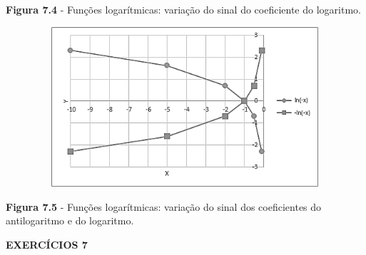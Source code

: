 \documentclass[12pt]{article}
\begin{document}

\par

\textbf{Figura 7.4} - Funções logarítmicas: variação do sinal do coeficiente do logaritmo.\par




\begin{figure}[H]
	\begin{Center}
		\includegraphics[width=4.39in,height=2.34in]{./media/image9.png}
	\end{Center}
\end{figure}



\par

\begin{adjustwidth}{0.69in}{0.0in}
\textbf{Figura 7.5} - Funções logarítmicas: variação do sinal dos coeficientes do antilogaritmo e do logaritmo.\par

\end{adjustwidth}


\vspace{\baselineskip}
{\fontsize{14pt}{16.8pt}\selectfont \textbf{EXERCÍCIOS 7}\par}\par
\end{document}
